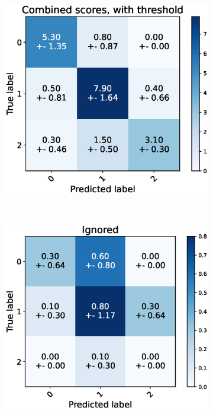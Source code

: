 \begin{figure}[H]
  \begin{subfigure}[t]{0.48\textwidth}
      \includegraphics[width=\textwidth]{files/figs/res/femval/cnf-combined-th.eps}
      \caption{}
      \label{fig:femval-cnf-comb-th}
  \end{subfigure}
  ~
  \begin{subfigure}[t]{0.48\textwidth}
      \includegraphics[width=\textwidth]{files/figs/res/femval/cnf-ignored.eps}

\end{subfigure}
\end{figure}
